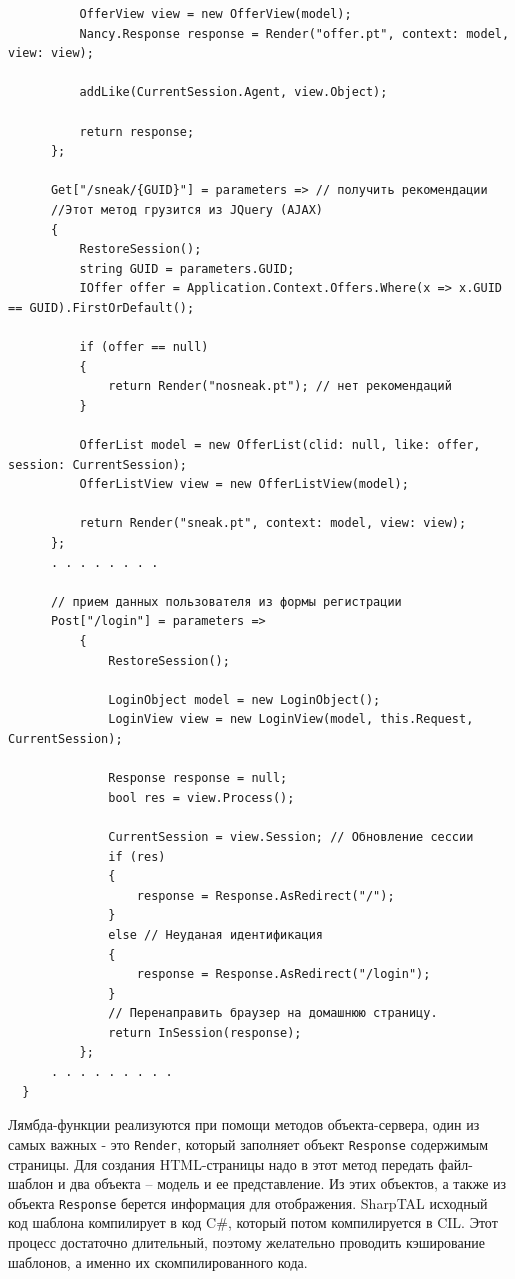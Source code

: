\documentclass[a4paper,14pt,openany,final]{extreport} %
\begin{document}
{\begin{verbatim}
          OfferView view = new OfferView(model);
          Nancy.Response response = Render("offer.pt", context: model, view: view);

          addLike(CurrentSession.Agent, view.Object);

          return response;
      };

      Get["/sneak/{GUID}"] = parameters => // получить рекомендации
      //Этот метод грузится из JQuery (AJAX)
      {
          RestoreSession();
          string GUID = parameters.GUID;
          IOffer offer = Application.Context.Offers.Where(x => x.GUID == GUID).FirstOrDefault();

          if (offer == null)
          {
              return Render("nosneak.pt"); // нет рекомендаций
          }

          OfferList model = new OfferList(clid: null, like: offer, session: CurrentSession);
          OfferListView view = new OfferListView(model);

          return Render("sneak.pt", context: model, view: view);
      };
      . . . . . . . .

      // прием данных пользователя из формы регистрации
      Post["/login"] = parameters =>
          {
              RestoreSession();

              LoginObject model = new LoginObject();
              LoginView view = new LoginView(model, this.Request, CurrentSession);

              Response response = null;
              bool res = view.Process();

              CurrentSession = view.Session; // Обновление сессии
              if (res)
              {
                  response = Response.AsRedirect("/");
              }
              else // Неуданая идентификация
              {
                  response = Response.AsRedirect("/login");
              }
              // Перенаправить браузер на домашнюю страницу.
              return InSession(response);
          };
      . . . . . . . . .
  }
\end{verbatim}

Лямбда-функции реализуются при помощи методов объекта-сервера, один из самых важных - это \verb|Render|, который заполняет объект \verb|Response| содержимым страницы. Для создания HTML-страницы надо в этот метод передать файл-шаблон и два объекта -- модель и ее представление. Из этих объектов, а также из объекта \verb|Response| берется информация для отображения. SharpTAL исходный код шаблона компилирует в код C\#, который потом компилируется в CIL. Этот процесс достаточно длительный, поэтому желательно проводить кэширование шаблонов, а именно их скомпилированного кода.

}
\end{document}
